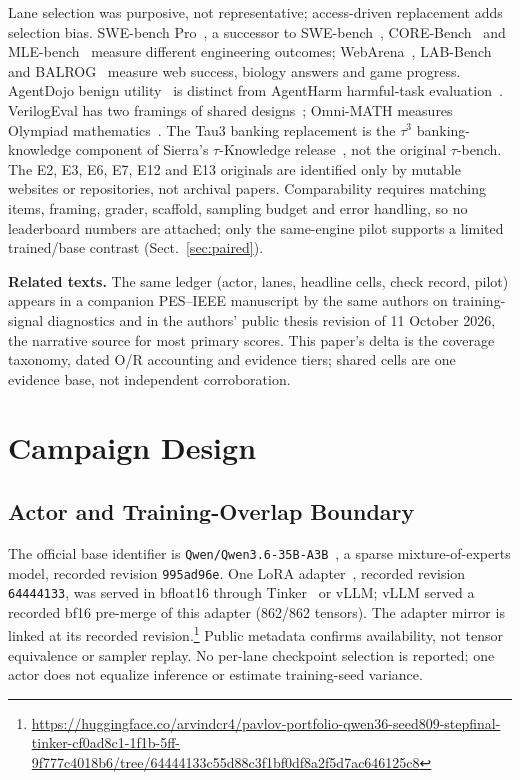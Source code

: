 \documentclass[a4paper,runningheads]{llncs}
\begin{document}
Lane selection was purposive, not representative; access-driven replacement
adds selection bias. SWE-bench
Pro~\cite{deng2025swebenchpro}, a successor to SWE-bench~\cite{jimenez2024swebench},
CORE-Bench~\cite{siegel2024corebench} and MLE-bench~\cite{chan2025mlebench}
measure different engineering outcomes; WebArena~\cite{zhou2024webarena},
LAB-Bench~\cite{laurent2024labbench} and BALROG~\cite{paglieri2025balrog}
measure web success, biology answers and game progress. AgentDojo benign
utility~\cite{debenedetti2024agentdojo} is distinct from AgentHarm harmful-task
evaluation~\cite{andriushchenko2025agentharm}. VerilogEval has two framings of
shared designs~\cite{liu2023verilogeval,pinckney2025revisiting}; Omni-MATH
measures Olympiad mathematics~\cite{gao2024omnimath}. The Tau3 banking
replacement is the $\tau^3$ banking-knowledge component of Sierra's
$\tau$-Knowledge release~\cite{shi2026tauknowledge}, not the original
$\tau$-bench. The E2, E3, E6, E7, E12 and E13 originals are identified only by
mutable websites or repositories, not archival papers. Comparability
requires matching items, framing, grader, scaffold, sampling budget and error
handling, so no leaderboard numbers are attached; only the same-engine pilot
supports a limited trained/base contrast (Sect.~\ref{sec:paired}).

\textbf{Related texts.} The same ledger (actor, lanes, headline cells, check
record, pilot) appears in a companion PES--IEEE manuscript by the same authors
on training-signal diagnostics and in the authors' public thesis revision of 11
October 2026, the narrative source for most primary scores. This paper's delta
is the coverage taxonomy, dated O/R accounting and evidence tiers; shared cells
are one evidence base, not independent corroboration.

\section{Campaign Design}
\subsection{Actor and Training-Overlap Boundary}
The official base identifier is \texttt{Qwen/Qwen3.6-35B-A3B}~\cite{qwen2026model}, a sparse
mixture-of-experts model, recorded revision \texttt{995ad96e}. One LoRA
adapter~\cite{hu2022lora}, recorded revision \texttt{64444133}, was served in
bfloat16 through Tinker~\cite{thinkingmachines2025tinker} or vLLM; vLLM served a
recorded bf16 pre-merge of this adapter (862/862 tensors). The adapter mirror is linked at its recorded revision.\footnote{\url{https://huggingface.co/arvindcr4/pavlov-portfolio-qwen36-seed809-stepfinal-tinker-cf0ad8c1-1f1b-5ff-9f777c4018b6/tree/64444133c55d88c3f1bf0df8a2f5d7ac646125c8}}
Public metadata confirms availability, not tensor equivalence or sampler
replay. No per-lane checkpoint selection is reported; one actor does not
equalize inference or estimate training-seed variance.
\end{document}
